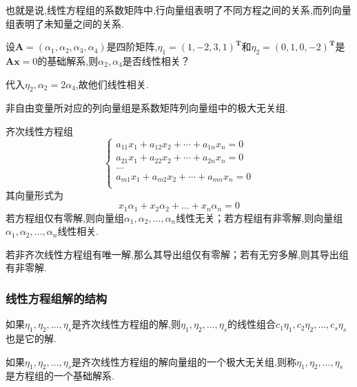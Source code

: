 也就是说,线性方程组的系数矩阵中,行向量组表明了不同方程之间的关系,而列向量组表明了未知量之间的关系.

\begin{examp}{设$\mathbf{A}=(\alpha_1,\alpha_2,\alpha_3,\alpha_4)$是四阶矩阵,$\eta_1=(1,-2,3,1)^{\mathbf{T}}$和$\eta_2=(0,1,0,-2)^{\mathbf{T}}$是$\mathbf{Ax}=0$的基础解系,则$\alpha_2,\alpha_4$是否线性相关？}

    \jie 代入$\eta_2,\alpha_2=2\alpha_4$,故他们线性相关.
\end{examp}

\begin{ttheorem}
    非自由变量所对应的列向量组是系数矩阵列向量组中的极大无关组.
\end{ttheorem}

\begin{ttheorem}
    齐次线性方程组
    \begin{equation*}
        \begin{cases}
            a_{11}x_1+a_{12}x_2+\dotsm+a_{1n}x_n= 0 \\
            a_{21}x_1+a_{22}x_2+\dotsm+a_{2n}x_n= 0 \\
            \dots \\
            a_{m1}x_1+a_{m2}x_2+\dotsm+a_{mn}x_n= 0 \\
        \end{cases}
    \end{equation*}
    其向量形式为
    \begin{equation*}
        x_1\alpha_1+x_2\alpha_2+\dots+x_n\alpha_n=0
    \end{equation*}
    若方程组仅有零解,则向量组$\alpha_1,\alpha_2,\dots,\alpha_n$线性无关；若方程组有非零解,则向量组$\alpha_1,\alpha_2,\dots,\alpha_n$线性相关.
\end{ttheorem}

\begin{ttheorem}
    若非齐次线性方程组有唯一解,那么其导出组仅有零解；若有无穷多解,则其导出组有非零解.
\end{ttheorem}

\subsubsection{线性方程组解的结构}
如果$\eta_1,\eta_2,\dots,\eta_s$是齐次线性方程组的解,则$\eta_1,\eta_2,\dots,\eta_s$的线性组合$c_1\eta_1,c_2\eta_2,\dots,c_s\eta_s$也是它的解.
\begin{definition}
    如果$\eta_1,\eta_2,\dots,\eta_s$是齐次线性方程组的解向量组的一个极大无关组,则称$\eta_1,\eta_2,\dots,\eta_s$是方程组的一个基础解系.
\end{definition}

